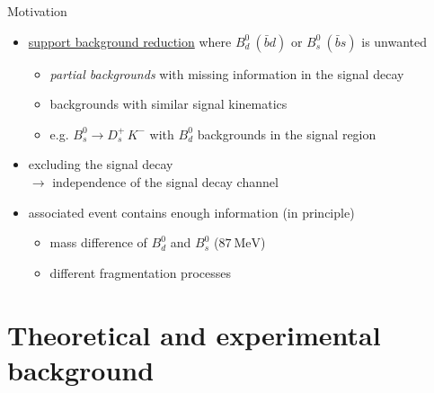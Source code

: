 \documentclass[aspectratio=1610, 10pt]{beamer}
\begin{document}
\begin{frame}{Motivation}
  \begin{itemize}
    \item \underline{support background reduction} where $B^0_d \: \left(\bar{b}d\right)$ or $B^0_s \: \left(\bar{b}s\right)$ is unwanted
    \begin{itemize}
      \item \textit{partial backgrounds} with missing information in the signal decay
      \item backgrounds with similar signal kinematics
      \item e.g. $B^0_s \rightarrow D^+_s \, K^-$ with $B^0_d$ backgrounds in the signal region
    \end{itemize}
    \pause
    \medskip
    \item excluding the signal decay \\$\rightarrow$ independence of the signal decay channel
    \item associated event contains enough information (in principle)
    \begin{itemize}
      \item mass difference of $B^0_d$ and $B^0_s$ ($\qty{87}{\MeV}$)
      \item different fragmentation processes
    \end{itemize} 
  \end{itemize}
\end{frame}

\section*{Theoretical and experimental background}
\end{document}
